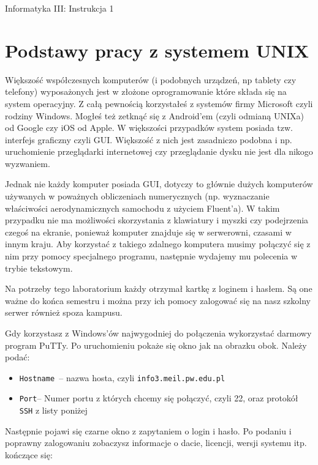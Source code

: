 \documentclass[landscape]{article}
\newcommand{\newtitle}{{\huge\begin{center}{\sc Informatyka III: Instrukcja \labnumber}\\{\it\mytitle}\end{center}}}
\newcommand{\mytitle}{}
\newcommand{\labnumber}{1}
\begin{document}
\newtitle

\section{Podstawy pracy z systemem UNIX}

Większość współczesnych komputerów (i podobnych urządzeń, np tablety czy telefony) wyposażonych jest w złożone oprogramowanie które składa się na system operacyjny. Z całą pewnością korzystałeś z systemów firmy Microsoft czyli rodziny Windows. Mogłeś też zetknąć się z Android'em  (czyli odmianą UNIXa) od Google czy iOS od Apple. W większości przypadków system posiada tzw. interfejs graficzny czyli GUI. Większość z nich jest zasadniczo podobna i np. uruchomienie przeglądarki internetowej czy przeglądanie dysku nie jest dla nikogo wyzwaniem.

Jednak nie każdy komputer posiada GUI, dotyczy to głównie dużych komputerów używanych w poważnych obliczeniach numerycznych (np. wyznaczanie właściwości aerodynamicznych samochodu z użyciem Fluent'a). W takim przypadku nie ma możliwości skorzystania z klawiatury i myszki czy podejrzenia czegoś na ekranie, ponieważ komputer znajduje się w serwerowni, czasami w innym kraju. Aby korzystać z takiego zdalnego komputera musimy połączyć się z nim przy pomocy specjalnego programu, następnie wydajemy mu polecenia w trybie tekstowym.

Na potrzeby tego laboratorium każdy otrzymał kartkę z loginem i hasłem. Są one ważne do końca semestru i można przy ich pomocy zalogować się na nasz szkolny serwer również spoza kampusu.

Gdy korzystasz z Windows'ów najwygodniej do połączenia wykorzystać darmowy program PuTTy. Po uruchomieniu pokaże się okno jak na obrazku obok. Należy podać:
\begin{itemize}
\item {\tt Hostname }-- nazwa hosta, czyli {\tt info3.meil.pw.edu.pl}
\item {\tt Port}-- Numer portu z których chcemy się połączyć, czyli 22, oraz protokół {\tt SSH} z listy poniżej
\end{itemize}



Następnie pojawi się czarne okno z zapytaniem o login i hasło. Po podaniu i poprawny zalogowaniu zobaczysz informacje o dacie, licencji, wersji systemu itp. kończące się:
\end{document}
